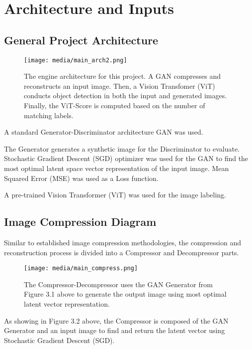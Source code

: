 \section{Architecture and Inputs}

\subsection{General Project Architecture}

\begin{figure}[H]
	\begin{center}
	\texttt{[image: media/main\_arch2.png]}
	\end{center}
	\caption[Model Architecture]{The engine architecture for this project. A GAN compresses and reconstructs
    an input image. Then, a Vision Transfomer (ViT) conducts object detection in both the input and generated images.
    Finally, the ViT-Score is computed based on the number of matching labels.}
	\end{figure}

A standard Generator-Discriminator architecture GAN was used. 

The Generator generates a synthetic image for the Discriminator to evaluate.
Stochastic Gradient Descent (SGD) optimizer was used for the GAN to find the most optimal latent space vector
representation of the input image.
Mean Squared Error (MSE) was used as a Loss function.

A pre-trained Vision Transformer (ViT) was used for the image labeling.


\subsection{Image Compression Diagram}

Similar to established image compression methodologies, the compression and reconstruction process 
is divided into a Compressor and Decompressor parts.

\begin{figure}[H]
	\begin{center}
	\texttt{[image: media/main\_compress.png]}
	\end{center}
	\caption[Compression Architecture]{The Compressor-Decompressor uses the GAN Generator from Figure 3.1 above 
    to generate the output image using most optimal latent vector representation.}
	\end{figure}

As showing in Figure 3.2 above, the Compressor is composed of the GAN Generator and an input image to find and return the latent vector using
Stochastic Gradient Descent (SGD).

